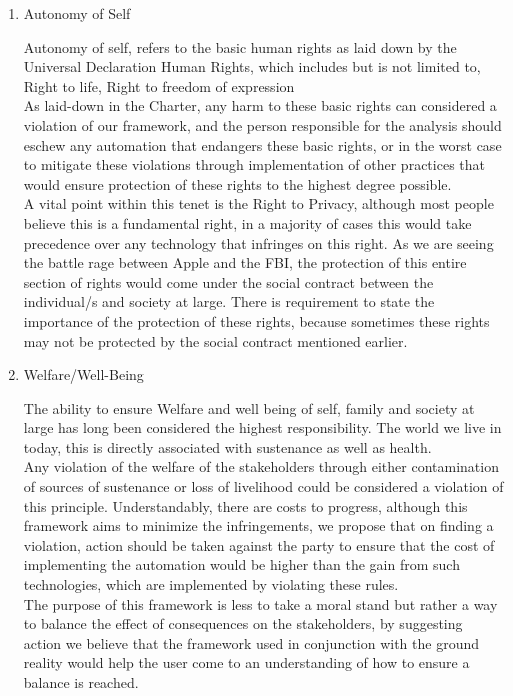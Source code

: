 \begin{enumerate}
\item Autonomy of Self
\begin{pointenv}
Autonomy of self, refers to the basic human rights as laid down by the Universal Declaration Human Rights\cite{assembly1948universal}, which includes but is not limited to, Right to life, Right to freedom of expression\\
As laid-down in the Charter, any harm to these basic rights can considered a violation of our framework, and the person responsible for the analysis should eschew any automation that endangers these basic rights, or in the worst case to mitigate these violations through implementation of other practices that would ensure protection of these rights to the highest degree possible.\\
A vital point within this tenet is the Right to Privacy, although most people believe this is a fundamental right, in a majority of  cases this would take precedence over any technology that infringes on this right. As we are seeing the battle rage between Apple and the FBI, the protection of this entire section of rights would come under the social contract between the individual/s and society at large. There is requirement to state the importance of the protection of these rights, because sometimes these rights may not be protected by the social contract mentioned earlier. 
\end{pointenv}

\item Welfare/Well-Being
\begin{pointenv}
The ability to ensure Welfare and well being of self, family and society at large has long been considered the highest responsibility. The world we live in today, this is directly associated with sustenance as well as health.\\
Any violation of the welfare of the stakeholders through either contamination of sources of sustenance or loss of livelihood could be considered a violation of this principle. Understandably, there are costs to progress, although this framework aims to minimize the infringements, we propose that on finding a violation, action should be taken against the party to ensure that the cost of implementing the automation would be higher than the gain from such technologies, which are implemented by violating these rules.\\
The purpose of this framework is less to take a moral stand but rather a way to balance the effect of consequences on the stakeholders, by suggesting action we believe that the framework used in conjunction with the ground reality would help the user come to an understanding of how to ensure a balance is reached. 
\end{pointenv}
\end{enumerate}

